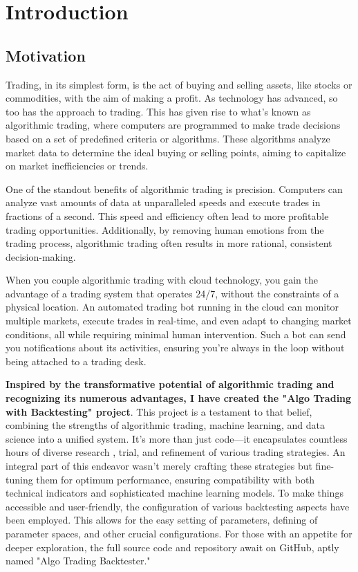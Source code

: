 \chapter{Introduction}

\section{Motivation}
Trading, in its simplest form, is the act of buying and selling assets, like stocks or commodities, with the aim of making a profit. As technology has advanced, so too has the approach to trading. This has given rise to what's known as algorithmic trading, where computers are programmed to make trade decisions based on a set of predefined criteria or algorithms. These algorithms analyze market data to determine the ideal buying or selling points, aiming to capitalize on market inefficiencies or trends.

One of the standout benefits of algorithmic trading is precision. Computers can analyze vast amounts of data at unparalleled speeds and execute trades in fractions of a second. This speed and efficiency often lead to more profitable trading opportunities. Additionally, by removing human emotions from the trading process, algorithmic trading often results in more rational, consistent decision-making.

When you couple algorithmic trading with cloud technology, you gain the advantage of a trading system that operates 24/7, without the constraints of a physical location. An automated trading bot running in the cloud can monitor multiple markets, execute trades in real-time, and even adapt to changing market conditions, all while requiring minimal human intervention. Such a bot can send you notifications about its activities, ensuring you're always in the loop without being attached to a trading desk.


\textbf{Inspired by the transformative potential of algorithmic trading and recognizing its numerous advantages, I have created the "Algo Trading with Backtesting" project}. This project is a testament to that belief, combining the strengths of algorithmic trading, machine learning, and data science into a unified system. It's more than just code—it encapsulates countless hours of diverse research
, trial, and refinement of various trading strategies. An integral part of this endeavor wasn't merely crafting these strategies but fine-tuning them for optimum performance, ensuring compatibility with both technical indicators and sophisticated machine learning models. To make things accessible and user-friendly, the configuration of various backtesting aspects have been employed. This allows for the easy setting of parameters, defining of parameter spaces, and other crucial configurations.
For those with an appetite for deeper exploration, the full source code and repository await on GitHub, aptly named "Algo Trading Backtester."

